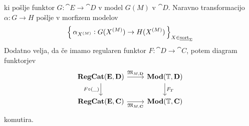 \documentclass[../kategoricna_logika.tex]{subfiles}
\begin{document}
ki pošlje funktor $G : \cat{E} \to \cat{D}$ v model $G(M)$ v
$\cat{D}$.  Naravno transformacijo $\alpha : G \to H$ pošlje v
morfizem modelov
$$\left\lbrace\,\alpha_{{X}^{(M)}}: G({X}^{(M)}) \to H({X}^{(M)})\,\right\rbrace_{X \in \underline{\mathrm{sort}}_{\Sigma}}$$
Dodatno velja, da če imamo regularen funktor
$F : \cat{D} \to \cat{C}$, potem diagram funktorjev
\begin{equation}
  \begin{tikzcd}
    \cat{RegCat}(\cat{E}, \cat{D}) \ar[d, "F \circ (\_)"'] \ar[r, "\mathfrak{M}_{M,\cat{D}}"] & \Mod(\T, \cat{D}) \ar[d, "F_T"] \\
    \cat{RegCat}(\cat{E}, \cat{C}) \ar[r, "\mathfrak{M}_{M,\cat{C}}"']
    & \Mod(\T, \cat{C})
  \end{tikzcd}
\end{equation}
komutira.
\end{document}
